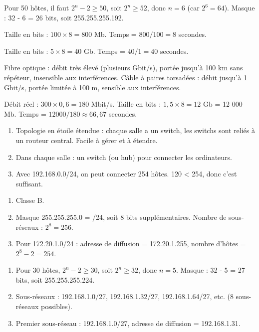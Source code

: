 Pour 50 hôtes, il faut $2^n - 2 \geq 50$, soit $2^n \geq 52$, donc $n = 6$ (car $2^6 = 64$). Masque : 32 - 6 = 26 bits, soit 255.255.255.192.

Taille en bits : $100 \times 8 = 800$ Mb. Temps = $800 / 100 = 8$ secondes.

Taille en bits : $5 \times 8 = 40$ Gb. Temps = $40 / 1 = 40$ secondes.

Fibre optique : débit très élevé (plusieurs Gbit/s), portée jusqu'à 100 km sans répéteur, insensible aux interférences. Câble à paires torsadées : débit jusqu'à 1 Gbit/s, portée limitée à 100 m, sensible aux interférences.

Débit réel : $300 \times 0,6 = 180$ Mbit/s. Taille en bits : $1,5 \times 8 = 12$ Gb = 12 000 Mb. Temps = $12 000 / 180 \approx 66,67$ secondes.

\begin{enumerate}
    \item Topologie en étoile étendue : chaque salle a un switch, les switchs sont reliés à un routeur central. Facile à gérer et à étendre.
    \item Dans chaque salle : un switch (ou hub) pour connecter les ordinateurs.
    \item Avec 192.168.0.0/24, on peut connecter 254 hôtes. 120 < 254, donc c'est suffisant.
\end{enumerate}

\begin{enumerate}
    \item Classe B.
    \item Masque 255.255.255.0 = /24, soit 8 bits supplémentaires. Nombre de sous-réseaux : $2^8 = 256$.
    \item Pour 172.20.1.0/24 : adresse de diffusion = 172.20.1.255, nombre d'hôtes = $2^8 - 2 = 254$.
\end{enumerate}

\begin{enumerate}
    \item Pour 30 hôtes, $2^n - 2 \geq 30$, soit $2^n \geq 32$, donc $n = 5$. Masque : 32 - 5 = 27 bits, soit 255.255.255.224.
    \item Sous-réseaux : 192.168.1.0/27, 192.168.1.32/27, 192.168.1.64/27, etc. (8 sous-réseaux possibles).
    \item Premier sous-réseau : 192.168.1.0/27, adresse de diffusion = 192.168.1.31.
\end{enumerate}

